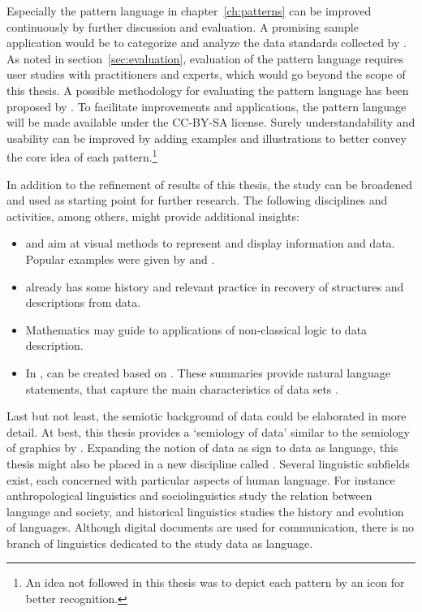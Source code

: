 Especially the pattern language in chapter~\ref{ch:patterns} can be improved
continuously by further discussion and evaluation. A promising sample
application would be to categorize and analyze the data standards collected by
\textcite{Riley2010}. As noted in section~\ref{sec:evaluation}, evaluation of
the pattern language requires user studies with practitioners and experts,
which would go beyond the scope of this thesis. A possible methodology for
evaluating the pattern language has been proposed by \textcite{Petter2010}.  To
facilitate improvements and applications, the pattern language will be made
available under the CC-BY-SA license. Surely understandability and usability
can be improved by adding examples and illustrations to better convey the core
idea of each pattern.\footnote{An idea not followed in this thesis was to
depict each pattern by an icon for better recognition.}

In addition to the refinement of results of this thesis, the study can be
broadened and used as starting point for further research. The following
disciplines and activities, among others, might provide additional insights:

\begin{itemize}
  \item {} and  aim at visual
	methods to represent and display information and data. Popular examples
	were given by \textcite{Tufte2001} and \textcite{Bertin2011}.
  \item {} already has some history and relevant practice
	in recovery of structures and descriptions from data.
  \item Mathematics may guide to applications of non-classical logic to 
	data description.
  \item In ,  can be 
	created based on . These summaries provide natural 
	language statements, that capture the main characteristics of data sets 
	\cite{Yager1981,Lietard2008}.

\end{itemize}

Last but not least, the semiotic background of data could be elaborated in more
detail. At best, this thesis provides a `semiology of data' similar to the
semiology of graphics by \textcite{Bertin1967,Bertin2011}. Expanding the notion
of data as sign to data as language, this thesis might also be placed in a new
discipline called .  Several linguistic subfields exist,
each concerned with particular aspects of human language. For instance
anthropological linguistics and sociolinguistics study the relation between
language and society, and historical linguistics studies the history and
evolution of languages. Although digital documents are used for communication,
there is no branch of linguistics dedicated to the study data as language.

